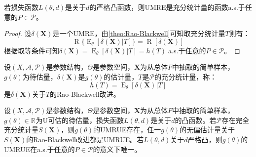 \begin{corollary}\label{cor:Rao-Blackwell}
	若损失函数$L(\theta,d)$是关于$d$的严格凸函数，则UMRE是充分统计量的函数a.s.于任意的$P\in\mathscr{P}$。
\end{corollary}
\begin{proof}
	设$\delta(\mathbf{X})$是一个UMRE，由\cref{theo:Rao-Blackwell}可知取充分统计量$T$则有：
	\begin{equation*}
		\operatorname{R}\{\operatorname{E}_{\theta}[\delta(\mathbf{X})|T]\}=\operatorname{R}[\delta(\mathbf{X})]
	\end{equation*}
	根据取等条件可知$\delta(\mathbf{X})=\operatorname{E}_{\theta}[\delta(\mathbf{X})|T]=h(T)\;$a.s.于任意的$P\in\mathscr{P}$。
\end{proof}
\begin{definition}
	设$(X,\mathscr{A},\mathscr{P})$是参数结构，$\Theta$是参数空间，$\mathbf{X}$为从总体$F$中抽取的简单样本，$g(\theta)$为待估量，$\delta(\mathbf{X})$是$g(\theta)$的估计量，$T$是$\mathscr{P}$的充分统计量，称：
	\begin{equation*}
		h(T)=\operatorname{E}_{\theta}[\delta(\mathbf{X})|T]
	\end{equation*}
	是$\delta(\mathbf{X})$关于$T$的Rao-Blackwell改进。
\end{definition}
\begin{theorem}
	\label{theo:Lehmann-Scheffe}
	设$(X,\mathscr{A},\mathscr{P})$是参数结构，$\Theta$是参数空间，$\mathbf{X}$为从总体$F$中抽取的简单样本，$g(\theta)\in\mathbb{R}^{}$为U可估的待估量，损失函数$L(\theta,d)$是关于$d$的凸函数。若$\mathscr{P}$存在完全充分统计量$S(\mathbf{X})$，则$g(\theta)$的UMRUE存在，任一$g(\theta)$的无偏估计量关于$S(\mathbf{X})$的Rao-Blackwell改进都是UMRUE。若$L(\theta,d)$关于$d$严格凸，则$g(\theta)$的UMRUE在a.s.于任意的$P\in\mathscr{P}$的意义下唯一。
\end{theorem}
